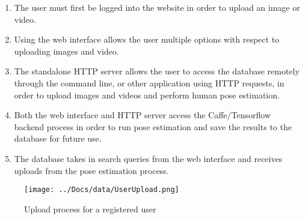 \documentclass{scrreprt}
\begin{document}
\begin{enumerate}
  \item The user must first be logged into the website in order to upload an image or video.
  \item Using the web interface allows the user multiple options with respect to uploading images and video.
  \item The standalone HTTP server allows the user to access the database
        remotely through the command line, or other application using HTTP
        requests, in order to upload images and videos and perform human pose
        estimation.
  \item Both the web interface and HTTP server access the Caffe/Tensorflow backend process in order to run pose estimation and save the results to the database for future use.
  \item The database takes in search queries from the web interface and receives uploads from the pose estimation process.
\end{enumerate}


\begin{figure}[!ht]
        \caption{Upload process for a registered user}
        \label{mediaUpload}
        \centering
        \texttt{[image: ../Docs/data/UserUpload.png]}
\end{figure}
\end{document}
